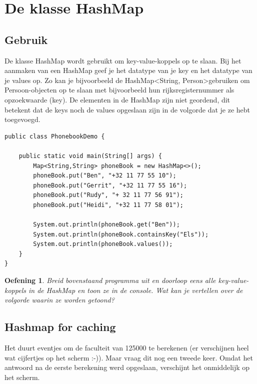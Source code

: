 \documentclass{tstextbook}
\newtheorem{envoefening}{Oefening}[chapter]
\newenvironment{oefening}
               {\begin{boxexercise}\begin{envoefening}}
               {\end{envoefening}\end{boxexercise}}
\begin{document}
\section{De klasse HashMap}

\subsection{Gebruik}

De klasse HashMap wordt gebruikt om key-value-koppels op te slaan. Bij het aanmaken van een HashMap geef je het datatype van je key en het datatype van je values op.
Zo kan je bijvoorbeeld de HashMap\textless String, Person\textgreater gebruiken om Persoon-objecten op te slaan met bijvoorbeeld hun rijksregisternummer als opzoekwaarde (key). De elementen in de HashMap zijn niet geordend, dit betekent dat de keys noch de values opgeslaan zijn in de volgorde dat je ze hebt toegevoegd.

\begin{lstlisting}
public class PhonebookDemo {

	public static void main(String[] args) {
		Map<String,String> phoneBook = new HashMap<>();
		phoneBook.put("Ben", "+32 11 77 55 10");
		phoneBook.put("Gerrit", "+32 11 77 55 16");
		phoneBook.put("Rudy", "+ 32 11 77 56 91");
		phoneBook.put("Heidi", "+32 11 77 58 01");

		System.out.println(phoneBook.get("Ben"));
		System.out.println(phoneBook.containsKey("Els"));
		System.out.println(phoneBook.values());
	}
}
\end{lstlisting}

\begin{oefening}
Breid bovenstaand programma uit en doorloop eens alle key-value-koppels in de HashMap en toon ze in de console. Wat kan je vertellen over de volgorde waarin ze worden getoond?
\end{oefening}

\subsection{Hashmap for caching}

Het duurt eventjes om de faculteit van 125000 te berekenen (er verschijnen heel wat cijfertjes op het scherm :-)). Maar vraag dit nog een tweede keer. Omdat het antwoord na de eerste berekening werd opgeslaan, verschijnt het onmiddelijk op het scherm. 
\end{document}
